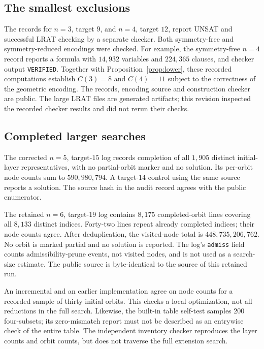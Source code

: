 \documentclass[11pt,a4paper]{article}
\begin{document}
\subsection{The smallest exclusions}
The records for $n=3$, target $9$, and $n=4$, target $12$, report UNSAT and successful LRAT checking by a separate checker. Both symmetry-free and symmetry-reduced encodings were checked. For example, the symmetry-free $n=4$ record reports a formula with $14{,}932$ variables and $224{,}365$ clauses, and checker output \texttt{VERIFIED}. Together with Proposition~\ref{prop:lower}, these recorded computations establish $C(3)=8$ and $C(4)=11$ subject to the correctness of the geometric encoding. The records, encoding source and construction checker are public. The large LRAT files are generated artifacts; this revision inspected the recorded checker results and did not rerun their checks.

\subsection{Completed larger searches}
The corrected $n=5$, target-$15$ log records completion of all $1{,}905$ distinct initial-layer representatives, with no partial-orbit marker and no solution. Its per-orbit node counts sum to $590{,}980{,}794$. A target-$14$ control using the same source reports a solution. The source hash in the audit record agrees with the public enumerator.

The retained $n=6$, target-$19$ log contains $8{,}175$ completed-orbit lines covering all $8{,}133$ distinct indices. Forty-two lines repeat already completed indices; their node counts agree. After deduplication, the visited-node total is $448{,}735{,}206{,}762$. No orbit is marked partial and no solution is reported. The log's \texttt{admiss} field counts admissibility-prune events, not visited nodes, and is not used as a search-size estimate. The public source is byte-identical to the source of this retained run.

An incremental and an earlier implementation agree on node counts for a recorded sample of thirty initial orbits. This checks a local optimization, not all reductions in the full search. Likewise, the built-in table self-test samples $200$ four-subsets; its zero-mismatch report must not be described as an entrywise check of the entire table. The independent inventory checker reproduces the layer counts and orbit counts, but does not traverse the full extension search.
\end{document}
